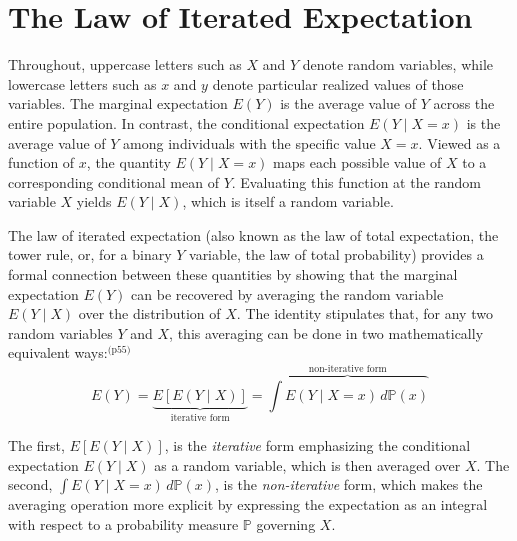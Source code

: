 \documentclass[12pt]{article}
\numberwithin{equation}{section}
\begin{document}
\section{The Law of Iterated Expectation}

Throughout, uppercase letters such as $X$ and $Y$ denote random variables, while lowercase letters such as $x$ and $y$ denote particular realized values of those variables. The marginal expectation $E(Y)$ is the average value of $Y$ across the entire population. In contrast, the conditional expectation $E(Y \mid X = x)$ is the average value of $Y$ among individuals with the specific value $X = x$. Viewed as a function of $x$, the quantity $E(Y \mid X = x)$ maps each possible value of $X$ to a corresponding conditional mean of $Y$. Evaluating this function at the random variable $X$ yields $E(Y \mid X)$, which is itself a random variable. 

The law of iterated expectation (also known as the law of total expectation, the tower rule, or, for a binary $Y$ variable, the law of total probability) provides a formal connection between these quantities by showing that the marginal expectation $E(Y)$ can be recovered by averaging the random variable $E(Y \mid X)$ over the distribution of $X$. The identity stipulates that, for any two random variables $Y$ and $X$, this averaging can be done in two mathematically equivalent ways:\cite{Wasserman2004}$^{\text{(p55)}}$
\begin{equation}
E(Y) = \underbrace{E[E(Y\mid X)]}_{\text{iterative form}} = \overbrace{\int E(Y \mid X = x)\,d\mathbb{P}(x)}^{\text{non-iterative form}}
\label{eqn:lie}
\end{equation}

\noindent %

The first, $E[E(Y\mid X)]$, is the \emph{iterative} form emphasizing the conditional expectation $E(Y\mid X)$ as a random variable, which is then averaged over $X$. The second, $\int E(Y\mid X=x)\,d\mathbb{P}(x)$, is the \emph{non-iterative} form, which makes the averaging operation more explicit by expressing the expectation as an integral with respect to a probability measure $\mathbb{P}$ governing $X$.
\end{document}
